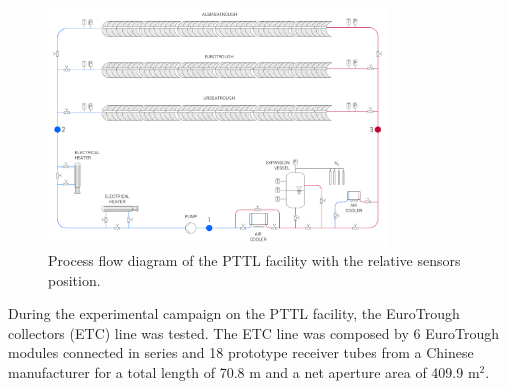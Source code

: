 \documentclass[final,3p,times,review]{elsarticle}
\begin{document}
%
\begin{figure}[h!]
\centering
\includegraphics[width=0.8\textwidth]{Figures/SchematicSF_V2.pdf}
\caption{Process flow diagram of the PTTL facility with the relative sensors position.}
\label{fig:PTTL_PI}
\end{figure}
%
During the experimental campaign on the PTTL facility, the EuroTrough collectors (ETC) line was tested. The ETC line was composed by 6 EuroTrough modules connected in series and 18 prototype receiver tubes from a Chinese manufacturer for a total length of 70.8 m and a net aperture area of 409.9 m$^2$.
%
\end{document}
